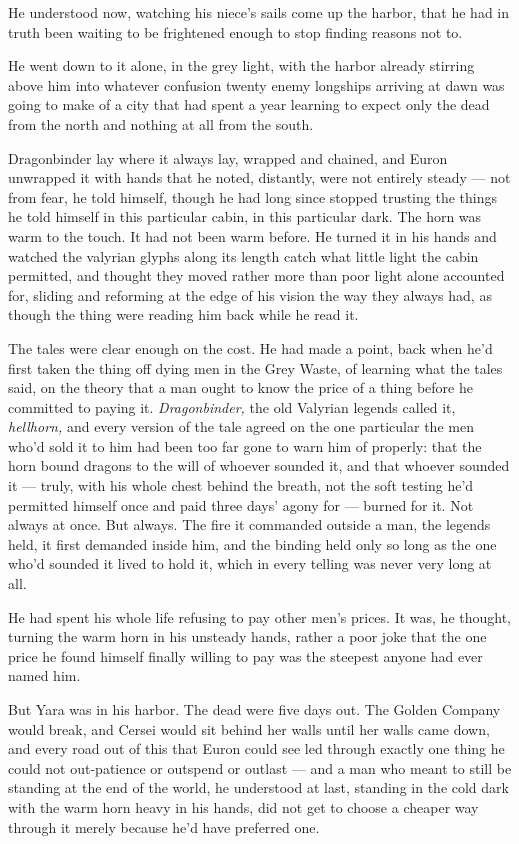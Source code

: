 He understood now, watching his niece’s sails come up the harbor, that he had in truth been waiting to be frightened enough to stop finding reasons not to.

\sceneBreak

He went down to it alone, in the grey light, with the harbor already stirring above him into whatever confusion twenty enemy longships arriving at dawn was going to make of a city that had spent a year learning to expect only the dead from the north and nothing at all from the south.

Dragonbinder lay where it always lay, wrapped and chained, and Euron unwrapped it with hands that he noted, distantly, were not entirely steady — not from fear, he told himself, though he had long since stopped trusting the things he told himself in this particular cabin, in this particular dark. The horn was warm to the touch. It had not been warm before. He turned it in his hands and watched the valyrian glyphs along its length catch what little light the cabin permitted, and thought they moved rather more than poor light alone accounted for, sliding and reforming at the edge of his vision the way they always had, as though the thing were reading him back while he read it.

The tales were clear enough on the cost. He had made a point, back when he’d first taken the thing off dying men in the Grey Waste, of learning what the tales said, on the theory that a man ought to know the price of a thing before he committed to paying it. \textit{Dragonbinder,} the old Valyrian legends called it, \textit{hellhorn,} and every version of the tale agreed on the one particular the men who’d sold it to him had been too far gone to warn him of properly: that the horn bound dragons to the will of whoever sounded it, and that whoever sounded it — truly, with his whole chest behind the breath, not the soft testing he’d permitted himself once and paid three days’ agony for — burned for it. Not always at once. But always. The fire it commanded outside a man, the legends held, it first demanded inside him, and the binding held only so long as the one who’d sounded it lived to hold it, which in every telling was never very long at all.

He had spent his whole life refusing to pay other men’s prices. It was, he thought, turning the warm horn in his unsteady hands, rather a poor joke that the one price he found himself finally willing to pay was the steepest anyone had ever named him.

But Yara was in his harbor. The dead were five days out. The Golden Company would break, and Cersei would sit behind her walls until her walls came down, and every road out of this that Euron could see led through exactly one thing he could not out-patience or outspend or outlast — and a man who meant to still be standing at the end of the world, he understood at last, standing in the cold dark with the warm horn heavy in his hands, did not get to choose a cheaper way through it merely because he’d have preferred one.

